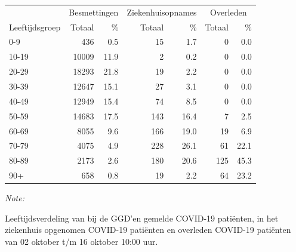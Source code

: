 \documentclass[
  english,
  man,floatsintext]{apa6}
\begin{document}
\begin{table}[H]
\centering\begingroup\fontsize{11}{13}\selectfont

\begin{threeparttable}
\begin{tabular}{lrrrrrr}
\toprule
\multicolumn{1}{c}{ } & \multicolumn{2}{c}{Besmettingen} & \multicolumn{2}{c}{Ziekenhuisopnames} & \multicolumn{2}{c}{Overleden} \\
\cmidrule(l{3pt}r{3pt}){2-3} \cmidrule(l{3pt}r{3pt}){4-5} \cmidrule(l{3pt}r{3pt}){6-7}
Leeftijdsgroep & Totaal & \% & Totaal & \% & Totaal & \%\\
\midrule
0-9 & 436 & 0.5 & 15 & 1.7 & 0 & 0.0\\
10-19 & 10009 & 11.9 & 2 & 0.2 & 0 & 0.0\\
20-29 & 18293 & 21.8 & 19 & 2.2 & 0 & 0.0\\
30-39 & 12647 & 15.1 & 27 & 3.1 & 0 & 0.0\\
40-49 & 12949 & 15.4 & 74 & 8.5 & 0 & 0.0\\
50-59 & 14683 & 17.5 & 143 & 16.4 & 7 & 2.5\\
60-69 & 8055 & 9.6 & 166 & 19.0 & 19 & 6.9\\
70-79 & 4075 & 4.9 & 228 & 26.1 & 61 & 22.1\\
80-89 & 2173 & 2.6 & 180 & 20.6 & 125 & 45.3\\
90+ & 658 & 0.8 & 19 & 2.2 & 64 & 23.2\\
\bottomrule
\end{tabular}
\begin{tablenotes}
\item \textit{Note: } 
\item Leeftijdsverdeling van bij de GGD’en gemelde COVID-19 patiënten, in het ziekenhuis opgenomen COVID-19 patiënten en overleden COVID-19 patiënten van 02 oktober t/m 16 oktober 10:00 uur.
\end{tablenotes}
\end{threeparttable}
\endgroup{}
\end{table}
\end{document}
